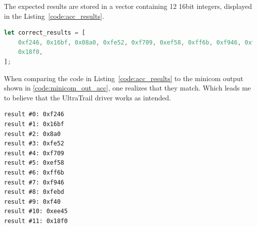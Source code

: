 The expected results are stored in a vector containing 12 16bit integers, displayed in the Listing~\ref{code:acc_results}.

\begin{minipage}{\textwidth}
\begin{lstlisting}[style=colorEX,language=Rust,caption={The expected results from the driver test},label={code:acc_results}]
let correct_results = [
    0xf246, 0x16bf, 0x08a0, 0xfe52, 0xf709, 0xef58, 0xff6b, 0xf946, 0xfebd, 0x0f40, 0xee45,
    0x18f0,
];
\end{lstlisting}
\end{minipage}

When comparing the code in Listing~\ref{code:acc_results} to the minicom output shown in \ref{code:minicom_out_acc},
one realizes that they match. Which leads me to believe that the UltraTrail driver works as intended.

\begin{minipage}{\textwidth}
\begin{lstlisting}[style=colorEx,caption={Minicom output after executing the driver test},label={code:minicom_out_acc}]
result #0: 0xf246
result #1: 0x16bf
result #2: 0x8a0
result #3: 0xfe52
result #4: 0xf709
result #5: 0xef58
result #6: 0xff6b
result #7: 0xf946
result #8: 0xfebd
result #9: 0xf40
result #10: 0xee45
result #11: 0x18f0
\end{lstlisting}
\end{minipage}



